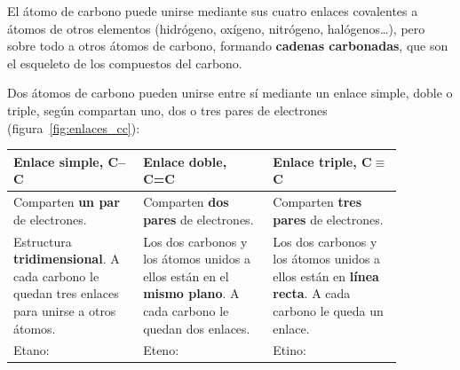 El átomo de carbono puede unirse mediante sus cuatro enlaces covalentes a átomos de otros elementos (hidrógeno, oxígeno, nitrógeno, halógenos\ldots), pero sobre todo a otros átomos de carbono, formando \textbf{cadenas carbonadas}, que son el esqueleto de los compuestos del carbono.

Dos átomos de carbono pueden unirse entre sí mediante un enlace simple, doble o triple, según compartan uno, dos o tres pares de electrones (figura~\ref{fig:enlaces_cc}):

\begin{center}
    {\small
    \begin{tabular}{@{}L{0.29\linewidth} L{0.29\linewidth} L{0.29\linewidth}@{}}
        \toprule
        \textbf{Enlace simple, C--C} & \textbf{Enlace doble, C=C} & \textbf{Enlace triple, C\(\equiv\)C} \\
        \midrule
        Comparten \textbf{un par} de electrones. & Comparten \textbf{dos pares} de electrones. & Comparten \textbf{tres pares} de electrones. \\[3pt]
        Estructura \textbf{tridimensional}. A cada carbono le quedan tres enlaces para unirse a otros átomos. & Los dos carbonos y los átomos unidos a ellos están en el \textbf{mismo plano}. A cada carbono le quedan dos enlaces. & Los dos carbonos y los átomos unidos a ellos están en \textbf{línea recta}. A cada carbono le queda un enlace. \\[3pt]
        Etano:  & Eteno:  & Etino:  \\
        \bottomrule
    \end{tabular}
    }
\end{center}

